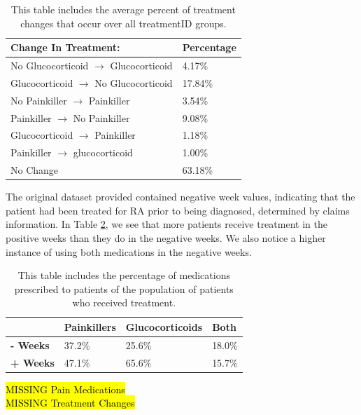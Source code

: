 \documentclass[10pt]{article}
\begin{document}
\begin{table}[H]
	\centering
	\begin{tabular}{l|l}
		\bf{Change In Treatment:} & \bf{Percentage} \\
		\hline
		No Glucocorticoid $\rightarrow$ Glucocorticoid & 4.17\% \\
		\hline
		Glucocorticoid $\rightarrow$ No Glucocorticoid & 17.84\% \\
		\hline
		No Painkiller $\rightarrow$ Painkiller &  3.54\% \\
		\hline
		Painkiller $\rightarrow$ No Painkiller & 9.08\% \\
		\hline
		Glucocorticoid $\rightarrow$ Painkiller & 1.18\% \\
		\hline
		Painkiller $\rightarrow$ glucocorticoid & 1.00\% \\
		\hline
		No Change & 63.18\% \\
		\hline
	\end{tabular}
	\caption{This table includes the average percent of treatment changes that occur over all treatmentID groups.}
	\label{changes}
\end{table}

The original dataset provided contained negative week values, indicating that the patient had been treated for RA prior to being diagnosed, determined by claims information. In Table \ref{negweeks}, we see that more patients receive treatment in the positive weeks than they do in the negative weeks. We also notice a higher instance of using both medications in the negative weeks. 

\begin{table}[H]
	\centering
	\begin{tabular}{l|l|l|l}
		~ & \textbf{Painkillers} & \textbf{Glucocorticoids} & \textbf{Both} \\
		\hline
		\textbf{- Weeks} & 37.2\% & 25.6\% & 18.0\% \\
		\hline
		\textbf{+ Weeks} & 47.1\% & 65.6\% & 15.7\% \\
		\hline
	\end{tabular}
	\caption{This table includes the percentage of medications prescribed to patients of the population of patients who received treatment.}
	\label{negweeks}
\end{table}

\hl{MISSING Pain Medications}\\

\hl{MISSING Treatment Changes} \\
\end{document}

